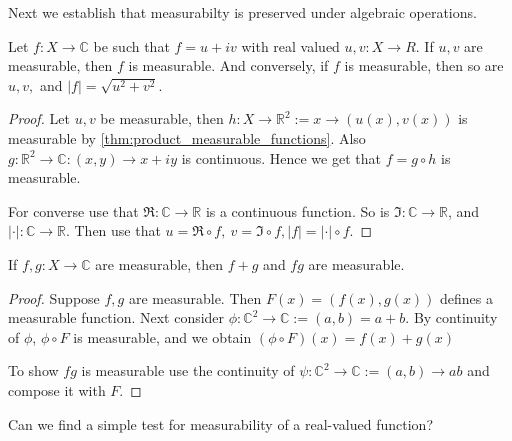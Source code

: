 Next we establish that measurabilty is preserved under algebraic operations.

\begin{proposition}
  Let $f:X \to \mathbb{C}$ be such that $f = u+iv$ with real valued $u, v : X \to R$. If $u, v$ are measurable, then $f$ is measurable. And conversely, if $f$ is measurable, then so are $u, v,$ and $|f| = \sqrt{u^2 + v^2}$.
\end{proposition}
\begin{proof}
  Let $u, v$ be measurable, then $h: X \to \mathbb{R}^2:= x \to (u(x), v(x))$ is measurable by \autoref{thm:product_measurable_functions}. Also $g:\mathbb{R}^2 \to \mathbb{C}: (x, y) \to x+iy$ is continuous. Hence we get that $f = g \circ h$ is measurable.

   For converse use that $\Re: \mathbb{C} \to \mathbb{R}$ is a continuous function. So is $\Im : \mathbb{C} \to \mathbb{R}$, and $|\cdot|: \mathbb{C} \to \mathbb{R}$. Then use that $u = \Re \circ f, \ v = \Im \circ f, |f| = |\cdot| \circ f$. 
\end{proof}

 \begin{proposition}
   \label{prop:algebra_of_measure_functions}
   If $f, g : X \to \mathbb{C}$ are measurable, then $f+g$ and $fg$ are measurable.
 \end{proposition}
 \begin{proof}
   Suppose $f, g$ are measurable. Then $F(x) = (f(x), g(x))$ defines a measurable function. Next consider $  \phi: \mathbb{C}^2 \to \mathbb{C}:= (a, b) = a+b$. By continuity of $\phi$, $\phi \circ F$ is measurable, and we obtain $(\phi \circ F)(x) = f(x) + g(x)$

   To show $fg$ is measurable use the continuity of $\psi: \mathbb{C}^2 \to \mathbb{C}:= (a, b) \to ab$ and compose it with $F$.
 \end{proof}

Can we find a simple test for measurability of a real-valued function?




